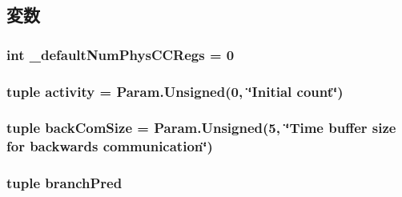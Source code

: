 \subsection{変数}
\hypertarget{classO3CPU_1_1DerivO3CPU_ae9356ac9392bb55de74ea37bd9d46685}{
\subsubsection[{\_\-defaultNumPhysCCRegs}]{\setlength{\rightskip}{0pt plus 5cm}int {\bf \_\-defaultNumPhysCCRegs} = 0}}
\label{classO3CPU_1_1DerivO3CPU_ae9356ac9392bb55de74ea37bd9d46685}
\hypertarget{classO3CPU_1_1DerivO3CPU_a179708190406cb8098a70bbdfd73088c}{
\subsubsection[{activity}]{\setlength{\rightskip}{0pt plus 5cm}tuple {\bf activity} = Param.Unsigned(0, \char`\"{}Initial count\char`\"{})}}
\label{classO3CPU_1_1DerivO3CPU_a179708190406cb8098a70bbdfd73088c}
\hypertarget{classO3CPU_1_1DerivO3CPU_a6fb79a7e84aed7aa969c44543052ac34}{
\subsubsection[{backComSize}]{\setlength{\rightskip}{0pt plus 5cm}tuple {\bf backComSize} = Param.Unsigned(5, \char`\"{}Time buffer size for backwards communication\char`\"{})}}
\label{classO3CPU_1_1DerivO3CPU_a6fb79a7e84aed7aa969c44543052ac34}
\hypertarget{classO3CPU_1_1DerivO3CPU_ac566dd90d96e45183abc6f54c960ffec}{
\subsubsection[{branchPred}]{\setlength{\rightskip}{0pt plus 5cm}tuple {\bf branchPred}}}
